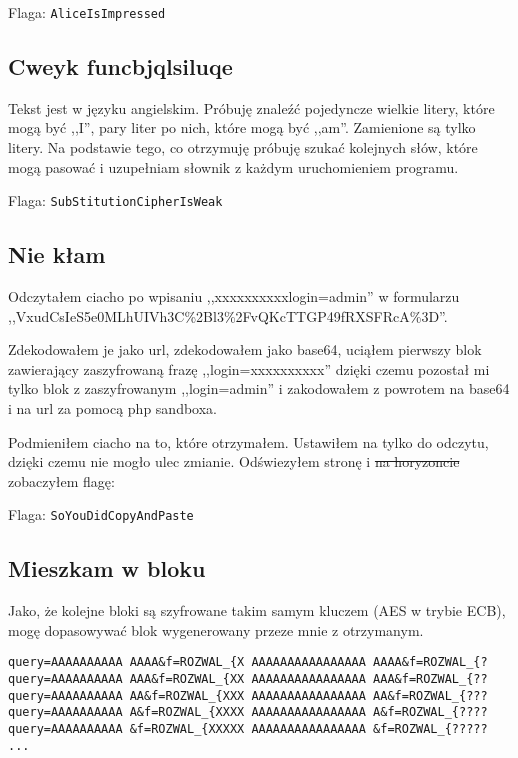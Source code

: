 \documentclass[a4paper]{article}
\begin{document}
Flaga: \texttt{AliceIsImpressed}

\subsection{Cweyk funcbjqlsiluqe}
Tekst jest w języku angielskim. Próbuję znaleźć pojedyncze wielkie litery, które mogą być ,,I'', pary liter po nich, które mogą być ,,am''. Zamienione są tylko litery. Na podstawie tego, co otrzymuję próbuję szukać kolejnych słów, które mogą pasować i uzupełniam słownik z każdym uruchomieniem programu.

Flaga: \texttt{SubStitutionCipherIsWeak}

\subsection{Nie kłam}
Odczytałem ciacho po wpisaniu ,,xxxxxxxxxxlogin=admin'' w formularzu \\ ,,VxudCsIeS5e0MLhUIVh3C\%2Bl3\%2FvQKcTTGP49fRXSFRcA\%3D''.

Zdekodowałem je jako url, zdekodowałem jako base64, uciąłem pierwszy blok zawierający zaszyfrowaną frazę ,,login=xxxxxxxxxx'' dzięki czemu pozostał mi tylko blok z zaszyfrowanym ,,login=admin'' i zakodowałem z powrotem na base64 i na url za pomocą php sandboxa.

Podmieniłem ciacho na to, które otrzymałem. Ustawiłem na tylko do odczytu, dzięki czemu nie mogło ulec zmianie. Odświezyłem stronę i \sout{na horyzoncie} zobaczyłem flagę:

Flaga: \texttt{SoYouDidCopyAndPaste}

\subsection{Mieszkam w bloku}
Jako, że kolejne bloki są szyfrowane takim samym kluczem (AES w trybie ECB), mogę dopasowywać blok wygenerowany przeze mnie z otrzymanym.

\texttt{query=AAAAAAAAAA AAAA\&f=ROZWAL\_\{X AAAAAAAAAAAAAAAA AAAA\&f=ROZWAL\_\{?\\
query=AAAAAAAAAA AAA\&f=ROZWAL\_\{XX AAAAAAAAAAAAAAAA AAA\&f=ROZWAL\_\{??\\
query=AAAAAAAAAA AA\&f=ROZWAL\_\{XXX AAAAAAAAAAAAAAAA AA\&f=ROZWAL\_\{???\\
query=AAAAAAAAAA A\&f=ROZWAL\_\{XXXX AAAAAAAAAAAAAAAA A\&f=ROZWAL\_\{????\\
query=AAAAAAAAAA \&f=ROZWAL\_\{XXXXX AAAAAAAAAAAAAAAA \&f=ROZWAL\_\{?????\\
...}
\end{document}
